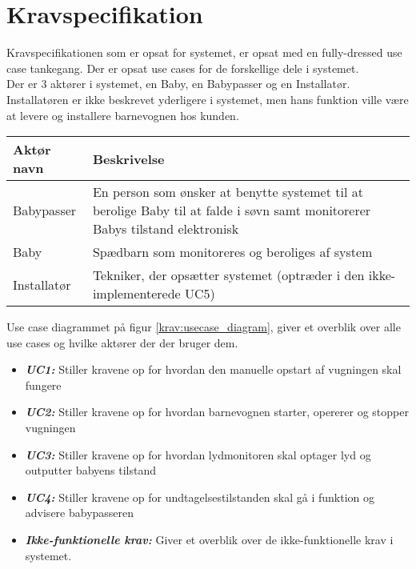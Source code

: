 \chapter{Kravspecifikation}

Kravspecifikationen som er opsat for systemet, er opsat med en fully-dressed use case tankegang. Der er opsat use cases for de forskellige dele i systemet. \\
Der er 3 aktører i systemet, en Baby, en Babypasser og en Installatør. Installatøren er ikke beskrevet yderligere i systemet, men hans funktion ville være at levere og installere barnevognen hos kunden.

\begin{table}[!htbp] \centering
	\begin{tabular}{|p{2.5cm}|p{11.5cm}|}
	\hline
		\textbf{Aktør navn} & \textbf{Beskrivelse} \\\hline
		Babypasser 
		& En person som ønsker at benytte systemet til at 
		  berolige Baby til at falde i søvn samt monitorerer Babys tilstand elektronisk
		\\\hline
		Baby 
		& Spædbarn som monitoreres og beroliges af system
		\\\hline
		Installatør
		& Tekniker, der opsætter systemet (optræder i den ikke-implementerede UC5)
		\\\hline
	\end{tabular}
\end{table}

Use case diagrammet på figur \ref{krav:usecase_diagram}, giver et overblik over alle use cases og hvilke aktører der der bruger dem.


\begin{itemize}
\item \textbf{\textit{UC1:}} Stiller kravene op for hvordan den manuelle opstart af vugningen skal fungere
\item \textbf{\textit{UC2:}} Stiller kravene op for hvordan barnevognen starter, opererer og stopper vugningen
\item \textbf{\textit{UC3:}} Stiller kravene op for hvordan lydmonitoren skal optager lyd og outputter babyens tilstand
\item \textbf{\textit{UC4:}} Stiller kravene op for undtagelsestilstanden skal gå i funktion og advisere babypasseren
\item \textbf{\textit{Ikke-funktionelle krav:}} Giver et overblik over de ikke-funktionelle krav i systemet. 
\end{itemize}

